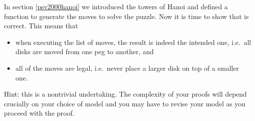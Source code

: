 %
\begin{isabellebody}%
\def\isabellecontext{a{\isadigit{6}}}%
\isamarkupfalse%
%
\isamarkuptrue%
%
\begin{isamarkuptext}%
In section \ref{psv2000hanoi} we introduced the towers of Hanoi and
defined a function  to generate the moves to solve the
puzzle.  Now it is time to show that  is correct. This
means that
\begin{itemize}
\item when executing the list of moves, the result is indeed the
intended one, i.e.\ all disks are moved from one peg to another, and
\item all of the moves are legal, i.e.\ never place a larger disk
on top of a smaller one.
\end{itemize}
Hint: this is a nontrivial undertaking. The complexity of your proofs
will depend crucially on your choice of model and you may have to
revise your model as you proceed with the proof.%
\end{isamarkuptext}%
\isamarkuptrue%
\isamarkupfalse%
\end{isabellebody}%
